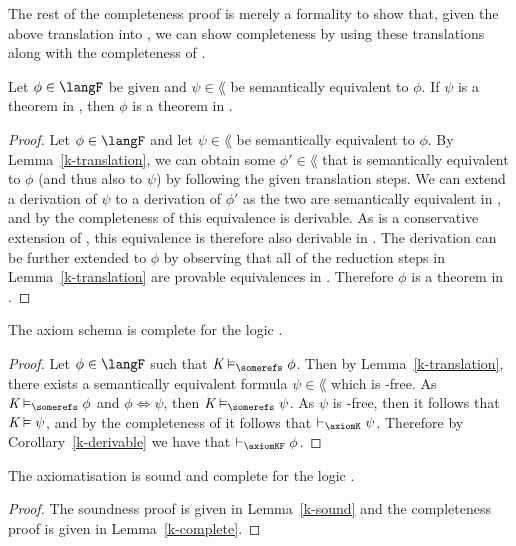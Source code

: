 The rest of the completeness proof is merely a formality to show that, given the
above translation into \lang{}, we can show completeness by using these
translations along with the completeness of \logicK{}.

\begin{corollary}\label{k-derivable}
Let $\phi \in \langF$ be given and $\psi \in \lang$ be semantically
equivalent to $\phi$.  If $\psi$ is a theorem in \logicK{}, then $\phi$ is a
theorem in \axiomKF{}.
\end{corollary}

\begin{proof} %
Let $\phi \in \langF$ and let $\psi \in \lang$ be semantically equivalent to
$\phi$. By Lemma~\ref{k-translation}, we can obtain some $\phi' \in \lang$
that is semantically equivalent to $\phi$ (and thus also to $\psi$) by following
the given translation steps. We can extend a derivation of $\psi$ to a
derivation of $\phi'$ as the two are semantically equivalent in \logicK{}, and by
the completeness of \logicK{} this equivalence is derivable. As \axiomKF{} is a
conservative extension of \logicK{}, this equivalence is therefore also derivable
in \axiomKF{}. The derivation can be further extended to $\phi$ by observing that all
of the reduction steps in Lemma~\ref{k-translation} are provable equivalences
in \axiomKF{}. Therefore $\phi$ is a theorem in \axiomKF{}.
\end{proof}

\begin{lemma}\label{k-complete}
The axiom schema \axiomKF{} is complete for the logic \logicKF{}.
\end{lemma}

\begin{proof}
Let $\phi \in \langF$ such that $\classK \entails_\somerefs \phi$. Then by
Lemma~\ref{k-translation}, there exists a semantically equivalent formula
$\psi \in \lang$ which is \somerefs-free. As $\classK \entails_\somerefs \phi$ and
$\phi \iff \psi$, then $\classK \entails_\somerefs \psi$. As $\psi$ is
\somerefs-free, then it follows that $\textit{K} \vDash \psi$, and by the
completeness of \axiomKF{} it follows that $\proves_{\axiomK} \psi$.
Therefore by Corollary~\ref{k-derivable} we have that $\proves_{\axiomKF}
\phi$.
\end{proof}

\begin{theorem}
The axiomatisation \axiomKF{} is sound and complete for the logic \logicKF{}.
\end{theorem}

\begin{proof}
The soundness proof is given in Lemma~\ref{k-sound} and the completeness
proof is given in Lemma~\ref{k-complete}.
\end{proof}

